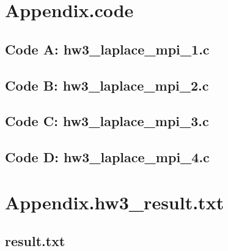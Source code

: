 \documentclass[11pt]{article}
\begin{document}
\newpage

\section{Appendix.code}

\subsection{Code A: hw3\_laplace\_mpi\_1.c}


\begin{footnotesize}

\end{footnotesize}


\subsection{Code B: hw3\_laplace\_mpi\_2.c}


\begin{footnotesize}

\end{footnotesize}



\subsection{Code C: hw3\_laplace\_mpi\_3.c}



\begin{footnotesize}

\end{footnotesize}




\subsection{Code D: hw3\_laplace\_mpi\_4.c}


\begin{footnotesize}

\end{footnotesize}

\section{Appendix.hw3\_result.txt}

\subsection{result.txt}
  \begin{footnotesize}
  
  \end{footnotesize}
\end{document}
